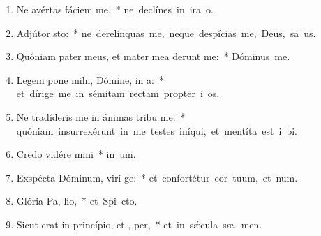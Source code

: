 \begin{flushleft}
\begin{enumerate}[leftmargin=*]
\item Ne avértas fáciem   me,~* \mbox{ne declínes in ira   o.}
\item Adjútor  sto:~* \mbox{ne derelínquas me, neque despícias me, Deus, sa us.}
\item Quóniam pater meus, et mater mea derunt me:~* \mbox{Dóminus   me.}
\item Legem pone mihi, Dómine, in  a:~* \mbox{et dírige me in sémitam rectam propter i os.}
\item Ne tradíderis me in ánimas tribu me:~* \mbox{quóniam insurrexérunt in me testes iníqui, et mentíta est i bi.}
\item Credo vidére  mini~* \mbox{in  um.}
\item Exspécta Dóminum, virí ge:~* \mbox{et confortétur cor tuum, et  num.}
\item Glória Pa,  lio,~* \mbox{et Spi cto.}
\item Sicut erat in princípio, et ,  per,~* \mbox{et in s\'{\ae}cula sæ. men.}


\end{enumerate}
\end{flushleft}


